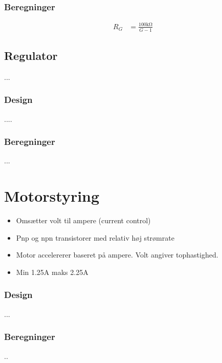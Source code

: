 
\subsubsection{Beregninger}

\begin{align}
	R_G & = \frac{100 \si{\kilo\ohm}}{G-1} 
	\end{align}


\subsection{Regulator}
...

\subsubsection{Design}

....

\subsubsection{Beregninger}
...


\section{Motorstyring}\label{sec:sec_motorstyring}

\begin{itemize}
	\item Omsætter volt til ampere (current control)
	\item Pnp og npn transistorer med relativ høj strømrate
	\item Motor accelererer baseret på ampere. Volt angiver tophastighed.
	\item Min 1.25A maks 2.25A
\end{itemize}

\subsubsection{Design}
...

\subsubsection{Beregninger}
..
